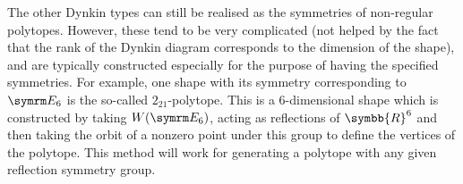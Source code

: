 \documentclass[fleqn, a4paper, openany]{memoir}
\newcommand{\reals}{\symbb{R}}
\begin{document}
    The other Dynkin types can still be realised as the symmetries of non-regular polytopes.
    However, these tend to be very complicated (not helped by the fact that the rank of the Dynkin diagram corresponds to the dimension of the shape), and are typically constructed especially for the purpose of having the specified symmetries.
    For example, one shape with its symmetry corresponding to \(\E[6]\) is the so-called \(2_{21}\)-polytope.
    This is a \(6\)-dimensional shape which is constructed by taking \(W(\E[6])\), acting as reflections of \(\reals^6\) and then taking the orbit of a nonzero point under this group to define the vertices of the polytope.
    This method will work for generating a polytope with any given reflection symmetry group.
\end{document}
